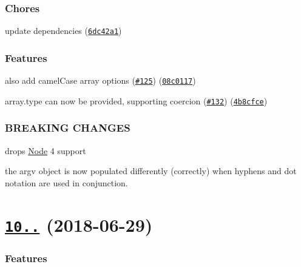 \subsubsection*{Chores}


\begin{DoxyItemize}
\item update dependencies (\href{https://github.com/yargs/yargs-parser/commit/6dc42a1}{\tt 6dc42a1})
\end{DoxyItemize}

\subsubsection*{Features}


\begin{DoxyItemize}
\item also add camel\+Case array options (\href{https://github.com/yargs/yargs-parser/issues/125}{\tt \#125}) (\href{https://github.com/yargs/yargs-parser/commit/08c0117}{\tt 08c0117})
\item array.\+type can now be provided, supporting coercion (\href{https://github.com/yargs/yargs-parser/issues/132}{\tt \#132}) (\href{https://github.com/yargs/yargs-parser/commit/4b8cfce}{\tt 4b8cfce})
\end{DoxyItemize}

\subsubsection*{B\+R\+E\+A\+K\+I\+NG C\+H\+A\+N\+G\+ES}


\begin{DoxyItemize}
\item drops \mbox{\hyperlink{classNode}{Node}} 4 support
\item the argv object is now populated differently (correctly) when hyphens and dot notation are used in conjunction.
\end{DoxyItemize}

\label{_10.1.0}%
 \section*{\href{https://github.com/yargs/yargs-parser/compare/v10.0.0...v10.1.0}{\tt 10..} (2018-\/06-\/29)}

\subsubsection*{Features}


